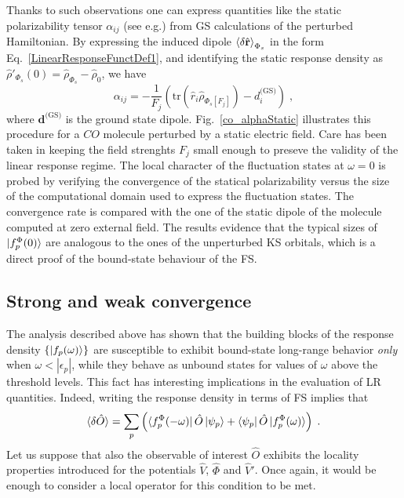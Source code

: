 \documentclass[reprint,aps,prb]{revtex4-1}
\newcommand{\eps}{\epsilon}
\newcommand{\be}{\begin{equation}}
\newcommand{\ee}{\end{equation}}
\newcommand{\lb}{\label}
\newcommand{\op}[1]{\hat {#1}}
\newcommand{\trace}[1]{\mathrm{tr}\left(#1\right)}
\newcommand{\dmnot}{\op{\rho}_0}
\newcommand{\dm}{\op{\rho}}
\begin{document}
Thanks to such observations one can express quantities like the static polarizability tensor $\alpha_{ij}$ (see e.g.\cite{DebElecField}) from GS calculations of the perturbed Hamiltonian.
By expressing the induced dipole $\braket{\delta \op{\mathbf r}}_{\Phi_s}$ in the form Eq.~\eqref{LinearResponseFunctDef1}, and identifying the static response density as $\dm'_{\Phi_s}(0) = \dm_{\Phi_s} -\dmnot $, we have
\be \label{staticalpha}
\alpha_{ij} =
-\frac{1}{F_j} \left(\trace{\op r_i \dm_{\Phi_s[F_j]}} - d^{\text{(GS)}}_i \right)\;,
\ee
where $\mathbf d^\text{(GS)}$ is the ground state dipole.
Fig.~\eqref{co_alphaStatic} illustrates this procedure for a $CO$ molecule
perturbed by a static electric field.
Care has been taken in keeping the field strenghts $F_j$ small enough to
preseve the validity of the linear response regime.
The local character of the fluctuation states at $\omega=0$ is
probed by verifying the convergence of the statical polarizability versus
the size of the computational domain used to express the fluctuation states. The convergence rate is compared with the
one of the static dipole of the molecule computed at zero external field.
The results evidence that the typical sizes of $\ket{f^\Phi_p(0)}$ are analogous to the ones of the unperturbed KS orbitals, which is a direct proof of the bound-state behaviour of the FS.

\subsection{Strong and weak convergence}

The analysis described above has shown that the building blocks of the response density $\{\ket{f_p(\omega)}\}$
are susceptible to exhibit bound-state long-range behavior \emph{only} when $\omega < |\eps_p|$,
while they behave as unbound states for values of $\omega$ above the threshold levels.
This fact has interesting implications in the evaluation of LR quantities. Indeed, writing the response
density in terms of FS implies that 
\be\lb{LinearResponseFunctDef2}
\braket{\delta\op O} = \sum_p \left( \bra{f_p^\Phi(-\omega)}\op O\ket{\psi_p}+ \bra{\psi_p}\op O\ket{f_p^\Phi(\omega)}\right) \;.
\ee
Let us suppose that also the observable of interest $\op O$ exhibits the locality properties introduced for the potentials $ \op V$, $\op \Phi$ and $\op V'$.
Once again, it would be enough to consider a local operator for this condition to be met.
\end{document}
